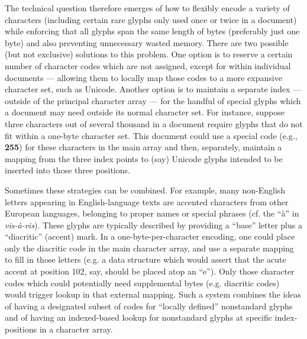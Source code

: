\documentclass[12pt,letterpaper]{article}
\newcommand{\p}[1]{

\vspace{.7em}#1}
\newcommand{\q}[1]{{\fontfamily{qcr}\selectfont ``}#1{\fontfamily{qcr}\selectfont ''}}
\begin{document}
{\p{The technical question therefore emerges of how to 
flexibly encode a variety of characters (including certain 
rare glyphs only used once or twice in a document) while 
enforcing that all glyphs span the same length of bytes 
(preferably just one byte) and also preventing unnecessary 
wasted memory.  There are two possible (but not 
exclusive) solutions to this problem.  One option is 
to reserve a certain number of character codes which are 
not assigned, except for within individual documents --- 
allowing them to locally map those codes to a more expansive 
character set, such as Unicode.  Another option is to 
maintain a separate index --- outside of the principal 
character array --- for the handful of special glyphs which 
a document may need outside its normal 
character set.  For instance, suppose three characters 
out of several thousand in a document require glyphs that 
do not fit within a one-byte character set.  This document 
could use a special code (e.g., \textbf{255}) for these characters 
in the main array and then, separately, maintain a mapping 
from the three index points to (say) Unicode glyphs intended 
to be inserted into those three positions.}

\p{Sometimes these strategies can be combined.  
For example, many non-English letters appearing 
in English-language texts are accented characters 
from other European languages, belonging to proper 
names or special phrases (cf. the \q{\`{a}} in 
\textit{vis-\`{a}-vis}).  These glyphs are typically 
described by providing a \q{base} letter plus a 
\q{diacritic} (accent) mark.  In a one-byte-per-character 
encoding, one could place only the diacritic code in 
the main character array, and use a separate mapping 
to fill in those letters (e.g. a data structure which 
would assert that the acute accent at position 102, say, 
should be placed atop an \q{e}).  Only those character 
codes which could potentially need supplemental bytes 
(e.g. diacritic codes) would trigger lookup in that 
external mapping.  Such a system combines the ideas 
of having a designated subset of codes for \q{locally defined} nonstandard 
glyphs and of having an indexed-based lookup for nonstandard 
glyphs at specific index-positions in a character array.}

}
\end{document}
